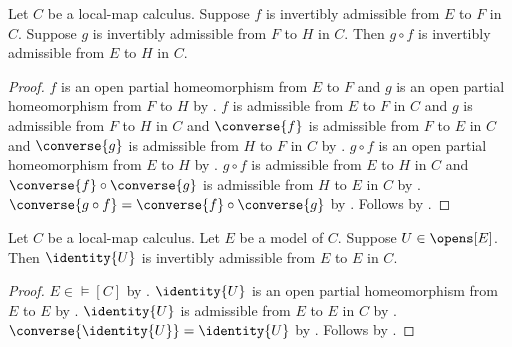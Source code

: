 \begin{theorem}\label{invertibly_admissible_composition}
    Let $C$ be a local-map calculus.
    Suppose $f$ is invertibly admissible from $E$ to $F$ in $C$.
    Suppose $g$ is invertibly admissible from $F$ to $H$ in $C$.
    Then $g\circ f$ is invertibly admissible from $E$ to $H$ in $C$.
\end{theorem}
\begin{proof}
    $f$ is an open partial homeomorphism from $E$ to $F$ and
        $g$ is an open partial homeomorphism from $F$ to $H$ by
        .
    $f$ is admissible from $E$ to $F$ in $C$ and
        $g$ is admissible from $F$ to $H$ in $C$ and
        $\converse{f}$ is admissible from $F$ to $E$ in $C$ and
        $\converse{g}$ is admissible from $H$ to $F$ in $C$ by
        .
    $g\circ f$ is an open partial homeomorphism from $E$ to $H$ by
        .
    $g\circ f$ is admissible from $E$ to $H$ in $C$ and
        $\converse{f}\circ\converse{g}$ is admissible from $H$ to $E$ in $C$ by
        .
    $\converse{g\circ f}=\converse{f}\circ\converse{g}$ by .
    Follows by .
\end{proof}

\begin{theorem}\label{invertibly_admissible_identity}
    Let $C$ be a local-map calculus.
    Let $E$ be a model of $C$.
    Suppose $U\in\opens[E]$.
    Then $\identity{U}$ is invertibly admissible from $E$ to $E$ in $C$.
\end{theorem}
\begin{proof}
    $E\in\models[C]$ by .
    $\identity{U}$ is an open partial homeomorphism from $E$ to $E$ by
        .
    $\identity{U}$ is admissible from $E$ to $E$ in $C$ by
        .
    $\converse{\identity{U}}=\identity{U}$ by .
    Follows by .
\end{proof}

